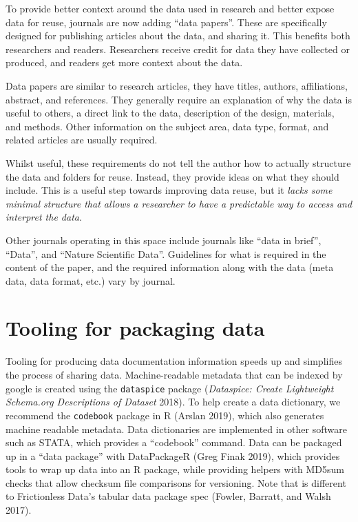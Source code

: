 \documentclass[
]{article}
\begin{document}
To provide better context around the data used in research and better expose data for reuse, journals are now adding ``data papers''. These are specifically designed for publishing articles about the data, and sharing it. This benefits both researchers and readers. Researchers receive credit for data they have collected or produced, and readers get more context about the data.

Data papers are similar to research articles, they have titles, authors, affiliations, abstract, and references. They generally require an explanation of why the data is useful to others, a direct link to the data, description of the design, materials, and methods. Other information on the subject area, data type, format, and related articles are usually required.

Whilst useful, these requirements do not tell the author how to actually structure the data and folders for reuse. Instead, they provide ideas on what they should include. This is a useful step towards improving data reuse, but it \emph{lacks some minimal structure that allows a researcher to have a predictable way to access and interpret the data}.

Other journals operating in this space include journals like ``data in brief'', ``Data'', and ``Nature Scientific Data''. Guidelines for what is required in the content of the paper, and the required information along with the data (meta data, data format, etc.) vary by journal.

\hypertarget{tooling}{%
\section{Tooling for packaging data}\label{tooling}}

Tooling for producing data documentation information speeds up and simplifies the process of sharing data. Machine-readable metadata that can be indexed by google is created using the \texttt{dataspice} package (\emph{Dataspice: Create Lightweight Schema.org Descriptions of Dataset} 2018). To help create a data dictionary, we recommend the \texttt{codebook} package in R (Arslan 2019), which also generates machine readable metadata. Data dictionaries are implemented in other software such as STATA, which provides a ``codebook'' command. Data can be packaged up in a ``data package'' with DataPackageR (Greg Finak 2019), which provides tools to wrap up data into an R package, while providing helpers with MD5sum checks that allow checksum file comparisons for versioning. Note that is different to Frictionless Data's tabular data package spec (Fowler, Barratt, and Walsh 2017).
\end{document}

